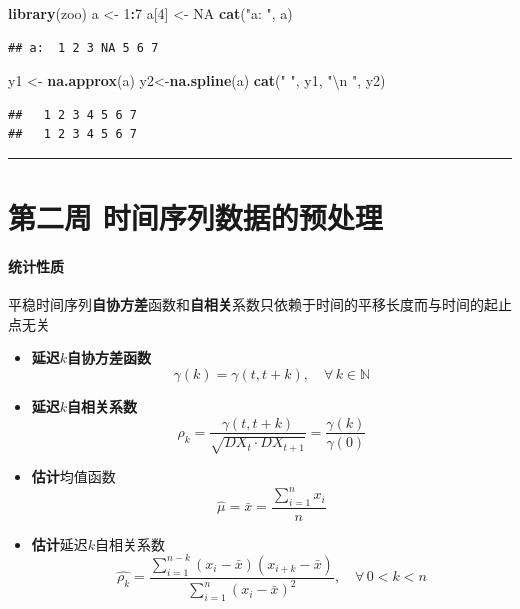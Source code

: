 \documentclass[]{article}
\newenvironment{Shaded}{\begin{snugshade}}{\end{snugshade}}
\newcommand{\CharTok}[1]{\textcolor[rgb]{0.31,0.60,0.02}{#1}}
\newcommand{\DecValTok}[1]{\textcolor[rgb]{0.00,0.00,0.81}{#1}}
\newcommand{\KeywordTok}[1]{\textcolor[rgb]{0.13,0.29,0.53}{\textbf{#1}}}
\newcommand{\NormalTok}[1]{#1}
\newcommand{\OperatorTok}[1]{\textcolor[rgb]{0.81,0.36,0.00}{\textbf{#1}}}
\newcommand{\OtherTok}[1]{\textcolor[rgb]{0.56,0.35,0.01}{#1}}
\newcommand{\StringTok}[1]{\textcolor[rgb]{0.31,0.60,0.02}{#1}}
\providecommand{\tightlist}{%
  \setlength{\itemsep}{0pt}\setlength{\parskip}{0pt}}
\let\oldparagraph\paragraph
\renewcommand{\paragraph}[1]{\oldparagraph{#1}\mbox{}}
\begin{document}
\begin{Shaded}
\begin{Highlighting}[]
\KeywordTok{library}\NormalTok{(zoo)}
\NormalTok{a <-}\StringTok{ }\DecValTok{1}\OperatorTok{:}\DecValTok{7}
\NormalTok{a[}\DecValTok{4}\NormalTok{] <-}\StringTok{ }\OtherTok{NA}
\KeywordTok{cat}\NormalTok{(}\StringTok{"a: "}\NormalTok{, a)}
\end{Highlighting}
\end{Shaded}

\begin{verbatim}
## a:  1 2 3 NA 5 6 7
\end{verbatim}

\begin{Shaded}
\begin{Highlighting}[]
\NormalTok{y1 <-}\StringTok{ }\KeywordTok{na.approx}\NormalTok{(a)}
\NormalTok{y2<-}\KeywordTok{na.spline}\NormalTok{(a)}
\KeywordTok{cat}\NormalTok{(}\StringTok{" "}\NormalTok{, y1, }\StringTok{"}\CharTok{\textbackslash{}n}\StringTok{ "}\NormalTok{, y2)}
\end{Highlighting}
\end{Shaded}

\begin{verbatim}
##   1 2 3 4 5 6 7 
##   1 2 3 4 5 6 7
\end{verbatim}

\begin{center}\rule{0.5\linewidth}{\linethickness}\end{center}

\hypertarget{ux7b2cux4e8cux5468-ux65f6ux95f4ux5e8fux5217ux6570ux636eux7684ux9884ux5904ux7406}{%
\section{第二周
时间序列数据的预处理}\label{ux7b2cux4e8cux5468-ux65f6ux95f4ux5e8fux5217ux6570ux636eux7684ux9884ux5904ux7406}}

\hypertarget{ux7edfux8ba1ux6027ux8d28}{%
\paragraph{统计性质}\label{ux7edfux8ba1ux6027ux8d28}}

平稳时间序列\textbf{自协方差}函数和\textbf{自相关}系数只依赖于时间的平移长度而与时间的起止点无关

\begin{itemize}
\tightlist
\item
  \textbf{延迟\(k\)自协方差函数} \[
  \gamma(k) = \gamma(t,t+k),\quad\forall\,k\in\mathbb{N}
  \]
\item
  \textbf{延迟\(k\)自相关系数} \[
  \rho_k = \frac{\gamma(t,t+k)}{\sqrt{DX_t\cdot DX_{t+1}}} = \frac{\gamma(k)}{\gamma(0)}
  \]
\item
  \textbf{估计}均值函数 \[
  \hat{\mu} = \bar{x} = \frac{\sum\limits_{i=1}^{n}x_i}{n}
  \]
\item
  \textbf{估计}延迟\(k\)自相关系数 \[
  \hat{\rho_k} = \frac{\sum\limits_{i=1}^{n-k}(x_i-\bar{x})(x_{i+k}-\bar{x})}{\sum\limits_{i=1}^{n}(x_i-\bar{x})^2},\quad\forall\,0<k<n
  \]
\end{itemize}
\end{document}
